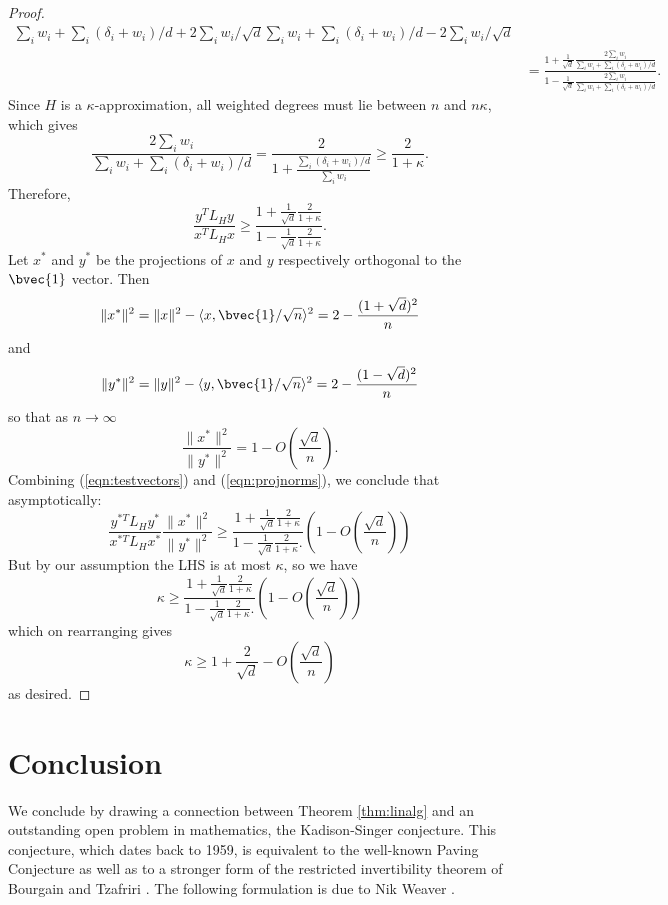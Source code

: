 \documentclass[12pt]{article}
\def\bigO#1{{{O}}\left( #1 \right) }
\begin{document}
\begin{proof}
\begin{align*}
{     \sum_i w_i + \sum_i (\delta_i + w_{i})/d + 2\sum_i w_i/\sqrt{d}
    }{
     \sum_i w_i + \sum_i (\delta_i + w_{i})/d - 2\sum_i w_i/\sqrt{d}
   }
   \\
   & = \frac{
     1+\frac{1}{\sqrt{d}}\frac{2\sum_i w_i}{\sum_i w_i + \sum_i (\delta_i + w_{i})/d}
    }{
     1-\frac{1}{\sqrt{d}}\frac{2\sum_i w_i}{\sum_i w_i + \sum_i (\delta_i + w_{i})/d}
    }.
\end{align*}
Since $H$ is a $\kappa$-approximation, all weighted degrees must lie between $n$
and $n\kappa$, which gives
\[
  \frac{
    2\sum_{i} w_{i}
  }{
    \sum_{i} w_{i} +\sum_i (\delta_i + w_{i})/d
  }
  = \frac{2}
    {1+\frac{
          \sum_i (\delta_i + w_{i})/d
	 }{
	  \sum_i w_i
	 }
    }
  \ge \frac{2}{1+\kappa}.
\]
Therefore,
\begin{equation}\label{eqn:testvectors} 
\frac{
  y^TL_Hy
}{
  x^TL_Hx
} \ge 
\frac{
  1+\frac{1}{\sqrt{d}}\frac{2}{1+\kappa}
  }{
  1-\frac{1}{\sqrt{d}}\frac{2}{1+\kappa}
}.
\end{equation}
Let $x^*$ and $y^*$ be the projections of $x$ and $y$ respectively orthogonal to
the $\bvec{1}$ vector. Then 
\[
  \|x^*\|^2 = \|x\|^2-\langle x,\bvec{1}/\sqrt{n}\rangle^2 =
  2-\frac{(1+\sqrt{d})^2}{n}
\]
and 
\[
  \|y^*\|^2 = \|y\|^2-\langle y,\bvec{1}/\sqrt{n}\rangle^2 =
  2-\frac{(1-\sqrt{d})^2}{n}
\]
so that as $n\to\infty$ 
\begin{equation}\label{eqn:projnorms}
\frac{\|x^*\|^2}{\|y^*\|^2} = 1 - \bigO{\frac{\sqrt{d}}{n}}.
\end{equation}
Combining (\ref{eqn:testvectors}) and (\ref{eqn:projnorms}), we conclude that asymptotically:
\[
  \frac{y^{*T}L_Hy^*}{x^{*T}L_Hx^*}
  \frac{\|x^*\|^2}{\|y^*\|^2}
  \ge 
\frac{
  1+\frac{1}{\sqrt{d}}\frac{2}{1+\kappa}
  }{
  1-\frac{1}{\sqrt{d}}\frac{2}{1+\kappa}.
}
\left( 1 - \bigO{\frac{\sqrt{d}}{n}} \right)
\]
But by our assumption the LHS is at most $\kappa$, so we have
\[
  \kappa \ge
\frac{
  1+\frac{1}{\sqrt{d}}\frac{2}{1+\kappa}
  }{
  1-\frac{1}{\sqrt{d}}\frac{2}{1+\kappa}.
}
\left( 1 - \bigO{\frac{\sqrt{d}}{n}} \right)
\]
which on rearranging gives
\[ 
  \kappa \ge 1+\frac{2}{\sqrt{d}} - \bigO{\frac{\sqrt{d}}{n}}
\]
as desired.
\end{proof}
\section{Conclusion}
We conclude by drawing a connection between Theorem \ref{thm:linalg} and an
  outstanding open problem in mathematics, the Kadison-Singer conjecture. 
This conjecture, which dates back to 1959, is equivalent to the well-known
  Paving Conjecture \cite{ak-and, cass} as well as to a stronger form of the restricted invertibility
  theorem of Bourgain and Tzafriri \cite{btz,cass}.
The following formulation is due to Nik Weaver \cite{weaver}.
\end{document}
